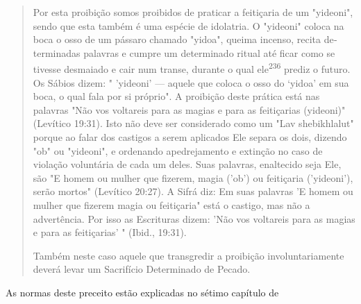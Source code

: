 \begin{quote}
Por esta proibição somos proibidos de praticar a feitiçaria de um
"yi­deoni", sendo que esta também é uma espécie de idolatria. O
"yideoni" colo­ca na boca o osso de um pássaro chamado "yidoa", queima
incenso, recita de­terminadas palavras e cumpre um determinado ritual
até ficar como se tivesse desmaiado e cair num transe, durante o qual
ele\textsuperscript{236} prediz o futuro. Os Sábios dizem: " 'yideoni'
--- aquele que coloca o osso do `yidoa' em sua boca, o qual fala por si
próprio". A proibição deste prática está nas palavras "Não vos
volta­reis para as magias e para as feitiçarias (yideoni)" (Levítico
19:31). Isto não deve ser considerado como um "Lav shebikhlalut" porque
ao falar dos castigos a serem aplicados Ele separa os dois, dizendo "ob"
ou "yideoni", e ordenando apedrejamento e extinção no caso de violação
voluntária de cada um deles. Suas palavras, enaltecido seja Ele, são "E
homem ou mulher que fizerem, magia ('ob') ou feitiçaria ('yideoni'),
serão mortos" (Levítico 20:27). A Sifrá diz: Em suas pa­lavras 'E homem
ou mulher que fizerem magia ou feitiçaria" está o castigo, mas não a
advertência. Por isso as Escrituras dizem: 'Não vos voltareis para as
ma­gias e para as feitiçarias' " (Ibid., 19:31).

Também neste caso aquele que transgredir a proibição involuntaria­mente
deverá levar um Sacrifício Determinado de Pecado.
\end{quote}

As normas deste preceito estão explicadas no sétimo capítulo de

